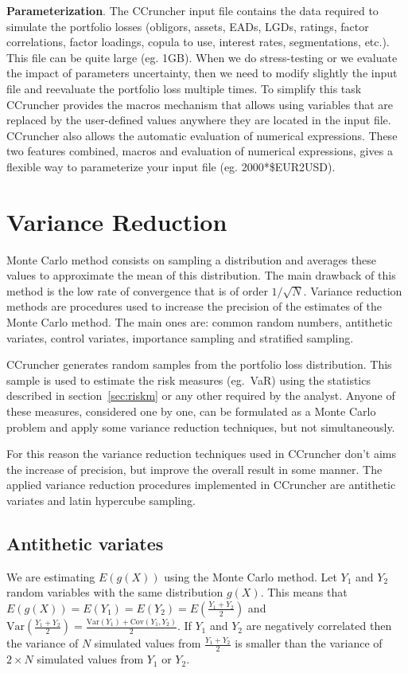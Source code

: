 \documentclass[11pt,fleqn]{book} %
\begin{document}
\textbf{Parameterization}. 
The CCruncher input file contains the data required to simulate the portfolio
losses (obligors, assets, EADs, LGDs, ratings, factor correlations, factor
loadings, copula to use, interest rates, segmentations, etc.). This file can 
be quite large (eg. 1GB). When we do stress-testing or we evaluate the impact 
of parameters uncertainty, then we need to modify slightly the input file and 
reevaluate the portfolio loss multiple times. To simplify this task CCruncher 
provides the macros mechanism that allows using variables that are replaced by 
the user-defined values anywhere they are located in the input file. CCruncher 
also allows the automatic evaluation of numerical expressions. These two 
features combined, macros and evaluation of numerical expressions, gives a 
flexible way to parameterize your input file (eg. 2000*\$EUR2USD). 

\section{Variance Reduction}

Monte Carlo method consists on sampling a distribution and averages these
values to approximate the mean of this distribution. The main drawback 
of this method is the low rate of convergence that is of order $1/\sqrt{N}$.
Variance reduction methods are procedures used to increase the precision 
of the estimates of the Monte Carlo method. The main ones are: common random 
numbers, antithetic variates, control variates, importance sampling and 
stratified sampling.

CCruncher generates random samples from the portfolio loss distribution.
This sample is used to estimate the risk measures (eg.\ VaR) using the 
statistics described in section~\ref{sec:riskm} or any other required 
by the analyst. Anyone of these measures, considered one by one, can be 
formulated as a Monte Carlo problem and apply some variance 
reduction techniques, but not simultaneously. 

For this reason the variance reduction techniques used in CCruncher 
don't aims the increase of precision, but improve the overall result in 
some manner. The applied variance reduction procedures implemented in
CCruncher are antithetic variates and latin hypercube sampling.

\subsection{Antithetic variates}
We are estimating $E(g(X))$ using the Monte 
Carlo method. Let $Y_1$ and $Y_2$ random variables with the same distribution
$g(X)$. This means that $E(g(X)) = E(Y_1) = E(Y_2) = E(\frac{Y_1+Y_2}{2})$ and
$\text{Var}\left(\frac{Y_1+Y_2}{2}\right) = 
\frac{\text{Var}(Y_1)+\text{Cov}(Y_1,Y_2)}{2}$.
If $Y_1$ and $Y_2$ are negatively correlated then the variance of $N$ 
simulated values from $\frac{Y_1+Y_2}{2}$ is smaller than the variance 
of $2{\times}N$ simulated values from $Y_1$ or $Y_2$.
\end{document}
